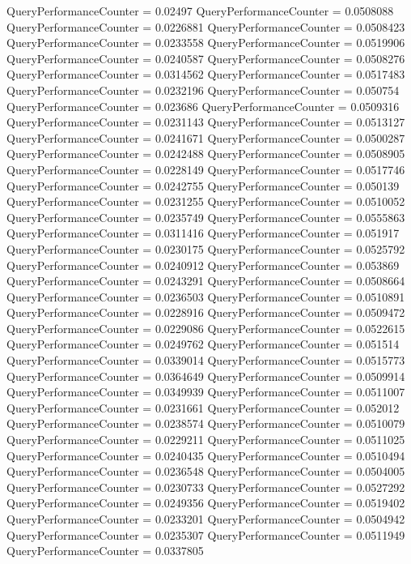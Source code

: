 \documentclass[9pt]{article}
\theoremstyle{plain}
\theoremstyle{definition}
\theoremstyle{remark}
\numberwithin{equation}{section}
\begin{document}
QueryPerformanceCounter  =  0.02497
QueryPerformanceCounter  =  0.0508088
QueryPerformanceCounter  =  0.0226881
QueryPerformanceCounter  =  0.0508423
QueryPerformanceCounter  =  0.0233558
QueryPerformanceCounter  =  0.0519906
QueryPerformanceCounter  =  0.0240587
QueryPerformanceCounter  =  0.0508276
QueryPerformanceCounter  =  0.0314562
QueryPerformanceCounter  =  0.0517483
QueryPerformanceCounter  =  0.0232196
QueryPerformanceCounter  =  0.050754
QueryPerformanceCounter  =  0.023686
QueryPerformanceCounter  =  0.0509316
QueryPerformanceCounter  =  0.0231143
QueryPerformanceCounter  =  0.0513127
QueryPerformanceCounter  =  0.0241671
QueryPerformanceCounter  =  0.0500287
QueryPerformanceCounter  =  0.0242488
QueryPerformanceCounter  =  0.0508905
QueryPerformanceCounter  =  0.0228149
QueryPerformanceCounter  =  0.0517746
QueryPerformanceCounter  =  0.0242755
QueryPerformanceCounter  =  0.050139
QueryPerformanceCounter  =  0.0231255
QueryPerformanceCounter  =  0.0510052
QueryPerformanceCounter  =  0.0235749
QueryPerformanceCounter  =  0.0555863
QueryPerformanceCounter  =  0.0311416
QueryPerformanceCounter  =  0.051917
QueryPerformanceCounter  =  0.0230175
QueryPerformanceCounter  =  0.0525792
QueryPerformanceCounter  =  0.0240912
QueryPerformanceCounter  =  0.053869
QueryPerformanceCounter  =  0.0243291
QueryPerformanceCounter  =  0.0508664
QueryPerformanceCounter  =  0.0236503
QueryPerformanceCounter  =  0.0510891
QueryPerformanceCounter  =  0.0228916
QueryPerformanceCounter  =  0.0509472
QueryPerformanceCounter  =  0.0229086
QueryPerformanceCounter  =  0.0522615
QueryPerformanceCounter  =  0.0249762
QueryPerformanceCounter  =  0.051514
QueryPerformanceCounter  =  0.0339014
QueryPerformanceCounter  =  0.0515773
QueryPerformanceCounter  =  0.0364649
QueryPerformanceCounter  =  0.0509914
QueryPerformanceCounter  =  0.0349939
QueryPerformanceCounter  =  0.0511007
QueryPerformanceCounter  =  0.0231661
QueryPerformanceCounter  =  0.052012
QueryPerformanceCounter  =  0.0238574
QueryPerformanceCounter  =  0.0510079
QueryPerformanceCounter  =  0.0229211
QueryPerformanceCounter  =  0.0511025
QueryPerformanceCounter  =  0.0240435
QueryPerformanceCounter  =  0.0510494
QueryPerformanceCounter  =  0.0236548
QueryPerformanceCounter  =  0.0504005
QueryPerformanceCounter  =  0.0230733
QueryPerformanceCounter  =  0.0527292
QueryPerformanceCounter  =  0.0249356
QueryPerformanceCounter  =  0.0519402
QueryPerformanceCounter  =  0.0233201
QueryPerformanceCounter  =  0.0504942
QueryPerformanceCounter  =  0.0235307
QueryPerformanceCounter  =  0.0511949
QueryPerformanceCounter  =  0.0337805
\end{document}
